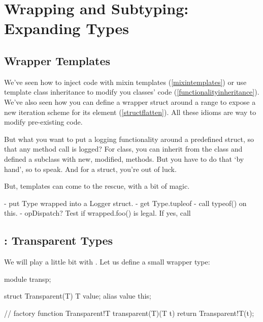 \section{Wrapping and Subtyping: Expanding Types}\label{expandingtypes}

\subsection{Wrapper Templates}\label{wrappertemplates}


We've seen how to inject code with mixin templates (\ref{mixintemplates}) or use template class inheritance to modify you classes' code (\ref{functionalityinheritance}). We've also seen how you can define a wrapper struct around a range to expose a new iteration scheme for its element (\ref{structflatten}). All these idioms are way to modify pre-existing code. 

But what you want to put a logging functionality around a predefined struct, so that any method call is logged? For class, you can inherit from the class and defined a subclass with new, modified, methods. But you have to do that `by hand', so to speak. And for a struct, you're out of luck.

But, templates can come to the rescue, with a bit of  magic.


- put Type wrapped into a Logger struct.
- get Type.tupleof
- call typeof() on this.
- opDispatch? Test if wrapped.foo() is legal. If yes, call

\subsection{\texorpdfstring{: Transparent Types}
                           {alias this: Transparent Types}}
\label{transparenttypes}

We will play a little bit with . Let us define a small wrapper type:

\begin{dcode}
module transp;

struct Transparent(T)
{
    T value;
    alias value this;
}

// factory function
Transparent!T transparent(T)(T t)
{
    return Transparent!T(t);
}
\end{dcode}

